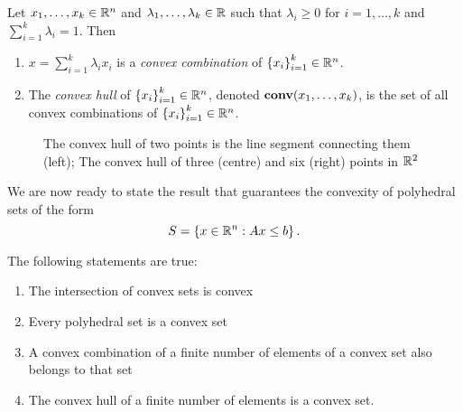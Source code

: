 \begin{definition} \label{p1c2:def:convex_combination_hull}
	Let $x_1, \dots, x_k \in \mathbb{R}^n$ and $\lambda_1,\dots, \lambda_k \in \mathbb{R}$ such that $\lambda_i \geq 0$ for $i = 1, \dots, k$ and $\sum_{i=1}^k \lambda_i = 1$. Then
	\begin{enumerate}
		\item $x = \sum_{i=1}^k \lambda_i x_i$ is a \emph{convex combination} of $\left\{ x_i \right \}_{i=1}^k \in \mathbb{R}^n$.
		\item The \emph{convex hull} of $\left\{ x_i \right \}_{i=1}^k \in \mathbb{R}^n$, denoted $\mathop{\bf conv}(x_1, \dots, x_k)$, is the set of all convex combinations of $\left\{ x_i \right \}_{i=1}^k \in \mathbb{R}^n$.
	\end{enumerate}		
\end{definition}

\begin{figure}
	\vspace{-6pt}
	\caption{The convex hull of two points is the line segment connecting them (left); The convex hull of three (centre) and six (right) points in $\mathbb{R}^2$} \label{p1c2:fig:convex_hulls}
\end{figure}	

We are now ready to state the result that guarantees the convexity of polyhedral sets of the form
$$
	S = \left\{ x \in \mathbb{R}^n : Ax \le b \right \}.
$$


\begin{theorem} \label{p1c2:thm:convexity}
	The following statements are true:
	\begin{enumerate}
		\item The intersection of convex sets is convex
		\item Every polyhedral set is a convex set
		\item A convex combination of a finite number of elements of a convex set also belongs to that set
		\item The convex hull of a finite number of elements is a convex set.			
	\end{enumerate}
\end{theorem}

